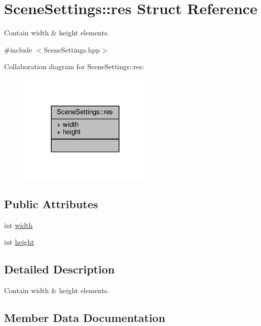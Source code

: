 \hypertarget{struct_scene_settings_1_1res}{}\section{Scene\+Settings\+:\+:res Struct Reference}
\label{struct_scene_settings_1_1res}


Contain width \& height elements.  




{\ttfamily \#include $<$Scene\+Settings.\+hpp$>$}



Collaboration diagram for Scene\+Settings\+:\+:res\+:
\nopagebreak
\begin{figure}[H]
\begin{center}
\leavevmode
\includegraphics[width=180pt]{struct_scene_settings_1_1res__coll__graph}
\end{center}
\end{figure}
\subsection*{Public Attributes}
\begin{DoxyCompactItemize}
\item 
int \hyperlink{struct_scene_settings_1_1res_ab777453ece0b8d50819d19724055a853}{width}
\item 
int \hyperlink{struct_scene_settings_1_1res_a52fa15904c33b42d91a0fbd27a3fbfaa}{height}
\end{DoxyCompactItemize}


\subsection{Detailed Description}
Contain width \& height elements. 

\subsection{Member Data Documentation}
\mbox{\label{struct_scene_settings_1_1res_a52fa15904c33b42d91a0fbd27a3fbfaa}} 
